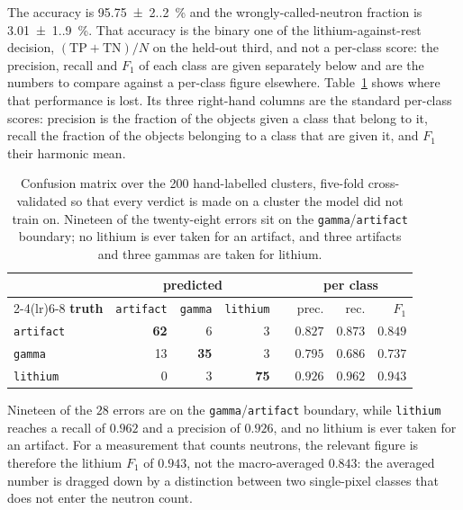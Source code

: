 \documentclass[a4paper,headsepline,oneside,11pt]{scrartcl}
\begin{document}
The accuracy is \SI{95.75(2.20)}{\percent} and the wrongly-called-neutron fraction is
\SI{3.01(1.90)}{\percent}. That accuracy is the binary one of the lithium-against-rest
decision, $(\mathrm{TP}+\mathrm{TN})/N$ on the held-out third, and not a
per-class score: the precision, recall and $F_1$ of each class are given
separately below and are the numbers to compare against a per-class figure
elsewhere. Table~\ref{tab:confusion} shows where that performance is lost. Its three right-hand
columns are the standard per-class scores: precision is the fraction of the
objects given a class that belong to it, recall the fraction of the objects
belonging to a class that are given it, and $F_1$ their harmonic mean.

\begin{table}[htbp]
  \centering
  \begin{tabular}{@{}l rrr c rrr@{}}
    \toprule
    & \multicolumn{3}{c}{\textbf{predicted}} & &
      \multicolumn{3}{c}{\textbf{per class}} \\
    \cmidrule(lr){2-4}\cmidrule(lr){6-8}
    \textbf{truth} & \texttt{artifact} & \texttt{gamma} & \texttt{lithium} & &
      prec. & rec. & $F_1$ \\
    \midrule
    \texttt{artifact} & \textbf{62} & 6  & 3  & & $0.827$ & $0.873$ & $0.849$ \\
    \texttt{gamma}    & 13 & \textbf{35} & 3  & & $0.795$ & $0.686$ & $0.737$ \\
    \texttt{lithium}  & 0  & 3  & \textbf{75} & & $0.926$ & $0.962$ & $0.943$ \\
    \bottomrule
  \end{tabular}
  \caption{Confusion matrix over the 200 hand-labelled clusters, five-fold
  cross-validated so that every verdict is made on a cluster the model did not
  train on. Nineteen of the twenty-eight errors sit on the
  \texttt{gamma}/\texttt{artifact} boundary; no lithium is ever taken for an
  artifact, and three artifacts and three gammas are taken for lithium.}
  \label{tab:confusion}
\end{table}


Nineteen of the $28$ errors are on the \texttt{gamma}/\texttt{artifact}
boundary, while \texttt{lithium} reaches a recall of $0.962$ and a precision of
$0.926$, and no lithium is ever taken for an artifact. For a measurement that counts
neutrons, the relevant figure is therefore the lithium $F_1$ of $0.943$, not the
macro-averaged $0.843$: the averaged number is dragged down by a distinction
between two single-pixel classes that does not enter the neutron count.
\end{document}
